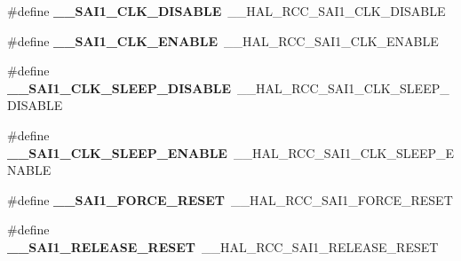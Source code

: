 \begin{DoxyCompactItemize}
\item 
\hypertarget{group___h_a_l___r_c_c___aliased_ga037179746d806a9eb830087a3d11a184}{\#define {\bfseries \-\_\-\-\_\-\-S\-A\-I1\-\_\-\-C\-L\-K\-\_\-\-D\-I\-S\-A\-B\-L\-E}~\-\_\-\-\_\-\-H\-A\-L\-\_\-\-R\-C\-C\-\_\-\-S\-A\-I1\-\_\-\-C\-L\-K\-\_\-\-D\-I\-S\-A\-B\-L\-E}\label{group___h_a_l___r_c_c___aliased_ga037179746d806a9eb830087a3d11a184}

\item 
\hypertarget{group___h_a_l___r_c_c___aliased_gafa304625058568d2853a58c18d3a57f0}{\#define {\bfseries \-\_\-\-\_\-\-S\-A\-I1\-\_\-\-C\-L\-K\-\_\-\-E\-N\-A\-B\-L\-E}~\-\_\-\-\_\-\-H\-A\-L\-\_\-\-R\-C\-C\-\_\-\-S\-A\-I1\-\_\-\-C\-L\-K\-\_\-\-E\-N\-A\-B\-L\-E}\label{group___h_a_l___r_c_c___aliased_gafa304625058568d2853a58c18d3a57f0}

\item 
\hypertarget{group___h_a_l___r_c_c___aliased_gad86ef4770d1d2e32c8395ff14dd9fb3e}{\#define {\bfseries \-\_\-\-\_\-\-S\-A\-I1\-\_\-\-C\-L\-K\-\_\-\-S\-L\-E\-E\-P\-\_\-\-D\-I\-S\-A\-B\-L\-E}~\-\_\-\-\_\-\-H\-A\-L\-\_\-\-R\-C\-C\-\_\-\-S\-A\-I1\-\_\-\-C\-L\-K\-\_\-\-S\-L\-E\-E\-P\-\_\-\-D\-I\-S\-A\-B\-L\-E}\label{group___h_a_l___r_c_c___aliased_gad86ef4770d1d2e32c8395ff14dd9fb3e}

\item 
\hypertarget{group___h_a_l___r_c_c___aliased_ga930f613f28d57aaec974d8a0e611c373}{\#define {\bfseries \-\_\-\-\_\-\-S\-A\-I1\-\_\-\-C\-L\-K\-\_\-\-S\-L\-E\-E\-P\-\_\-\-E\-N\-A\-B\-L\-E}~\-\_\-\-\_\-\-H\-A\-L\-\_\-\-R\-C\-C\-\_\-\-S\-A\-I1\-\_\-\-C\-L\-K\-\_\-\-S\-L\-E\-E\-P\-\_\-\-E\-N\-A\-B\-L\-E}\label{group___h_a_l___r_c_c___aliased_ga930f613f28d57aaec974d8a0e611c373}

\item 
\hypertarget{group___h_a_l___r_c_c___aliased_ga6fa8759253db7e8a4feaf7e4f5e40a3e}{\#define {\bfseries \-\_\-\-\_\-\-S\-A\-I1\-\_\-\-F\-O\-R\-C\-E\-\_\-\-R\-E\-S\-E\-T}~\-\_\-\-\_\-\-H\-A\-L\-\_\-\-R\-C\-C\-\_\-\-S\-A\-I1\-\_\-\-F\-O\-R\-C\-E\-\_\-\-R\-E\-S\-E\-T}\label{group___h_a_l___r_c_c___aliased_ga6fa8759253db7e8a4feaf7e4f5e40a3e}

\item 
\hypertarget{group___h_a_l___r_c_c___aliased_ga9348bdfef0e79a335e4c4c00cdd77e18}{\#define {\bfseries \-\_\-\-\_\-\-S\-A\-I1\-\_\-\-R\-E\-L\-E\-A\-S\-E\-\_\-\-R\-E\-S\-E\-T}~\-\_\-\-\_\-\-H\-A\-L\-\_\-\-R\-C\-C\-\_\-\-S\-A\-I1\-\_\-\-R\-E\-L\-E\-A\-S\-E\-\_\-\-R\-E\-S\-E\-T}\label{group___h_a_l___r_c_c___aliased_ga9348bdfef0e79a335e4c4c00cdd77e18}


\end{DoxyCompactItemize}
